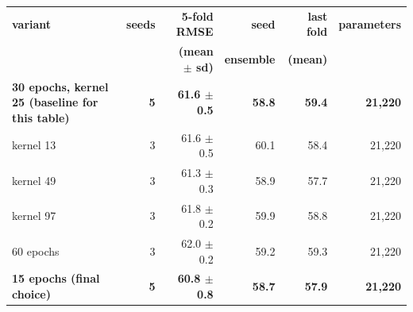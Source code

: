 \begin{tabular}{@{}p{2.7in}rrrrr@{}}
\toprule
\textbf{variant} & \textbf{seeds} & \textbf{5-fold RMSE} & \textbf{seed} & \textbf{last fold} & \textbf{parameters} \\
 & & \textbf{(mean $\pm$ sd)} & \textbf{ensemble} & \textbf{(mean)} & \\
\midrule
\textbf{30 epochs, kernel 25 (baseline for this table)} & \textbf{5} & \textbf{61.6 $\pm$ 0.5} & \textbf{58.8} & \textbf{59.4} & \textbf{21{,}220} \\
kernel 13 & 3 & 61.6 $\pm$ 0.5 & 60.1 & 58.4 & 21{,}220 \\
kernel 49 & 3 & 61.3 $\pm$ 0.3 & 58.9 & 57.7 & 21{,}220 \\
kernel 97 & 3 & 61.8 $\pm$ 0.2 & 59.9 & 58.8 & 21{,}220 \\
60 epochs & 3 & 62.0 $\pm$ 0.2 & 59.2 & 59.3 & 21{,}220 \\
\textbf{\textbf{15 epochs (final choice)}} & \textbf{5} & \textbf{60.8 $\pm$ 0.8} & \textbf{58.7} & \textbf{57.9} & \textbf{21{,}220} \\
\bottomrule
\end{tabular}
